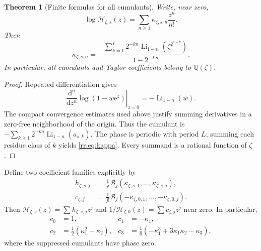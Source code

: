 \documentclass[11pt,a4paper,oneside,openany]{book}
\numberwithin{equation}{chapter}
\newtheorem{theorem}{Theorem}[chapter]
\theoremstyle{definition}
\theoremstyle{remark}
\newcommand{\Q}{\mathbb Q}
\newcommand{\e}{\mathrm e}
\DeclareMathOperator{\Li}{Li}
\newcommand{\B}{\mathcal B}
\newcommand{\Hp}{\mathcal H}
\begin{document}
\begin{theorem}[Finite formulas for all cumulants]
\label{rr:thm:cumulants}
Write, near zero,
\begin{equation}
 \log\Hp_{\zeta,s}(z)=\sum_{n\geq1}\kappa_{\zeta,s,n}\frac{z^n}{n!}.
\end{equation}
Then
\begin{equation}
 \boxed{\quad
 \kappa_{\zeta,s,n}=
 -\frac{\displaystyle\sum_{k=1}^L2^{-kn}
       \Li_{1-n}(\zeta^{2^{s-k}})}{1-2^{-Ln}}.
 \quad}
 \label{rr:eq:kappa}
\end{equation}
In particular, all cumulants and Taylor coefficients belong to \(\Q(\zeta)\).
\end{theorem}
\begin{proof}
Repeated differentiation gives
\[
 \left.\frac{\mathrm d^n}{\mathrm dz^n}\log(1-w\e^z)\right|_{z=0}
 =-\Li_{1-n}(w).
\]
The compact convergence estimates used above justify summing derivatives in a zero-free neighborhood of the origin. Thus the cumulant is
\(-\sum_{k\geq1}2^{-kn}\Li_{1-n}(a_{s,k})\).
The phase is periodic with period \(L\); summing each residue class of \(k\) yields \eqref{rr:eq:kappa}. Every summand is a rational function of \(\zeta\).
\end{proof}

Define two coefficient families explicitly by
\begin{align}
 h_{\zeta,s,j}
 &=\frac1{j!}\B_j(\kappa_{\zeta,s,1},\ldots,\kappa_{\zeta,s,j}),
 \label{rr:eq:hcoeff}\\
 c_{\zeta,j}
 &=\frac1{j!}\B_j(-\kappa_{\zeta,0,1},\ldots,-\kappa_{\zeta,0,j}).
 \label{rr:eq:ccoeff}
\end{align}
Then \(\Hp_{\zeta,s}(z)=\sum h_{\zeta,s,j}z^j\) and
\(1/\Hp_{\zeta,0}(z)=\sum c_{\zeta,j}z^j\) near zero. In particular,
\begin{align}
 c_0&=1,&c_1&=-\kappa_1,\\
 c_2&=\tfrac12(\kappa_1^2-\kappa_2),&
 c_3&=\tfrac16(-\kappa_1^3+3\kappa_1\kappa_2-\kappa_3),
 \label{rr:eq:firstc}
\end{align}
where the suppressed cumulants have phase zero.
\end{document}
